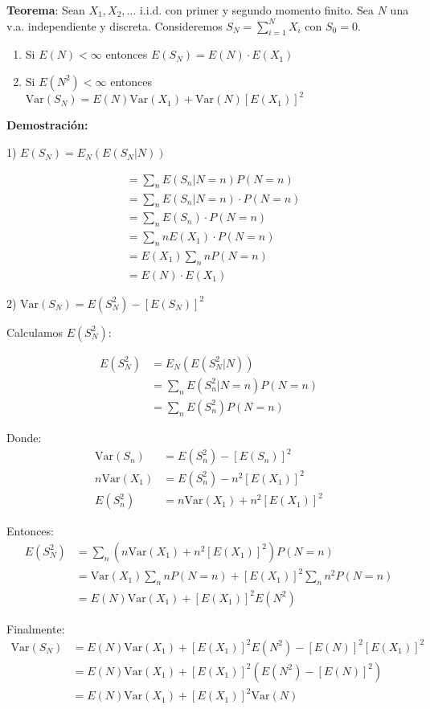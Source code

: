 \documentclass[12pt,a4paper]{article}
\newcommand{\teorema}[1]{%
\begin{teoremabox}
\textbf{Teorema}: #1
\end{teoremabox}
}
\begin{document}
\teorema{Sean $X_1, X_2, \ldots$ i.i.d. con primer y segundo momento finito. Sea $N$ una v.a. independiente y discreta. Consideremos $S_N = \sum_{i=1}^{N} X_i$ con $S_0 = 0$.
\begin{enumerate}
\item Si $E(N) < \infty$ entonces $E(S_N) = E(N) \cdot E(X_1)$
\item Si $E(N^2) < \infty$ entonces $\text{Var}(S_N) = E(N) \text{Var}(X_1) + \text{Var}(N) [E(X_1)]^2$
\end{enumerate}}

\textbf{Demostración:}

1) $E(S_N) = E_N(E(S_N|N))$

\begin{align*}
&= \sum_n E(S_n|N=n) P(N=n) \\
&= \sum_n E(S_n|N=n) \cdot P(N=n) \\
&= \sum_n E(S_n) \cdot P(N=n) \\
&= \sum_n n E(X_1) \cdot P(N=n) \\
&= E(X_1) \sum_n n P(N=n) \\
&= E(N) \cdot E(X_1)
\end{align*}

2) $\text{Var}(S_N) = E(S_N^2) - [E(S_N)]^2$

Calculamos $E(S_N^2)$:

\begin{align*}
E(S_N^2) &= E_N(E(S_N^2|N)) \\
&= \sum_n E(S_n^2|N=n) P(N=n) \\
&= \sum_n E(S_n^2) P(N=n)
\end{align*}

Donde:
\begin{align*}
\text{Var}(S_n) &= E(S_n^2) - [E(S_n)]^2 \\
n\text{Var}(X_1) &= E(S_n^2) - n^2[E(X_1)]^2 \\
E(S_n^2) &= n\text{Var}(X_1) + n^2[E(X_1)]^2
\end{align*}

Entonces:
\begin{align*}
E(S_N^2) &= \sum_n \left(n\text{Var}(X_1) + n^2[E(X_1)]^2\right) P(N=n) \\
&= \text{Var}(X_1) \sum_n n P(N=n) + [E(X_1)]^2 \sum_n n^2 P(N=n) \\
&= E(N)\text{Var}(X_1) + [E(X_1)]^2 E(N^2)
\end{align*}

Finalmente:
\begin{align*}
\text{Var}(S_N) &= E(N)\text{Var}(X_1) + [E(X_1)]^2 E(N^2) - [E(N)]^2[E(X_1)]^2 \\
&= E(N)\text{Var}(X_1) + [E(X_1)]^2\left(E(N^2) - [E(N)]^2\right) \\
&= E(N)\text{Var}(X_1) + [E(X_1)]^2\text{Var}(N)
\end{align*}
\end{document}
